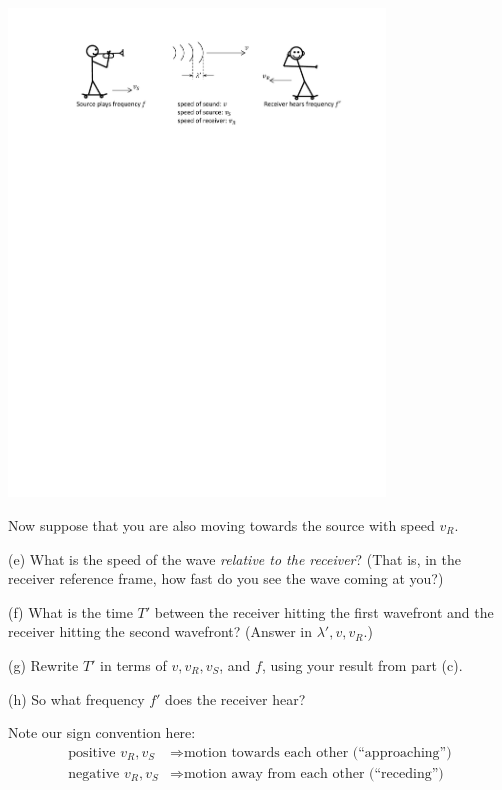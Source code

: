 \begin{center}
\includegraphics[width=0.75\textwidth]{doppler_shift/moving_observer.pdf}
\end{center}

Now suppose that you are also moving towards the source with speed $v_R$.  

(e) What is the speed of the wave \textit{relative to the receiver}?  (That is, in the receiver reference frame, how fast do you see the wave coming at you?) 
\vspace{1.0in}

(f) What is the time $T'$ between the receiver hitting the first wavefront and the receiver hitting the second wavefront? (Answer in $\lambda', v, v_R$.)
\vspace{1.0in}

(g) Rewrite $T'$ in terms of $v, v_R, v_S$, and $f$, using your result from part (c).
\vspace{1.0in}

(h) So what frequency $f'$ does the receiver hear?

\vfill

Note our sign convention here:
\begin{align*}
\textrm{positive } v_R, v_S &\Longrightarrow \textrm{motion towards each other (``approaching'')} \\
\textrm{negative } v_R, v_S &\Longrightarrow \textrm{motion away from each other (``receding'')} 
\end{align*}
